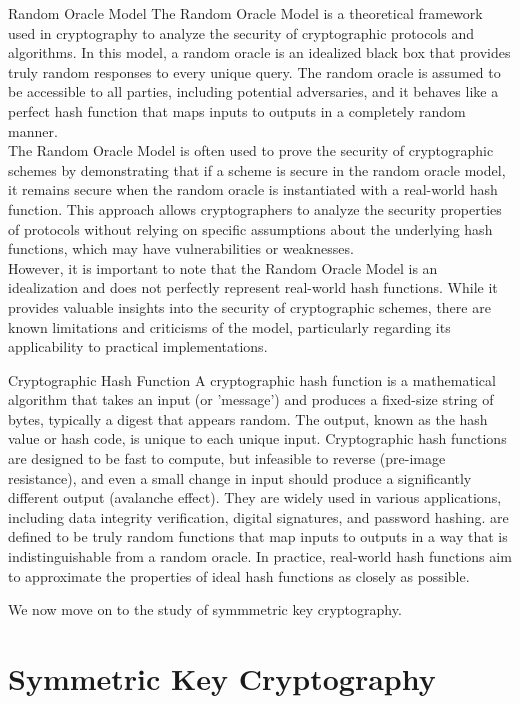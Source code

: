 \documentclass[openany]{book}
\begin{document}
\begin{mydefinition}
{Random Oracle Model}
The Random Oracle Model is a theoretical framework used in cryptography to analyze the security of cryptographic protocols and algorithms. In this model, a random oracle is an idealized black box that provides truly random responses to every unique query. The random oracle is assumed to be accessible to all parties, including potential adversaries, and it behaves like a perfect hash function that maps inputs to outputs in a completely random manner. \\
The Random Oracle Model is often used to prove the security of cryptographic schemes by demonstrating that if a scheme is secure in the random oracle model, it remains secure when the random oracle is instantiated with a real-world hash function. This approach allows cryptographers to analyze the security properties of protocols without relying on specific assumptions about the underlying hash functions, which may have vulnerabilities or weaknesses. \\
However, it is important to note that the Random Oracle Model is an idealization and does not perfectly represent real-world hash functions. While it provides valuable insights into the security of cryptographic schemes, there are known limitations and criticisms of the model, particularly regarding its applicability to practical implementations.
\end{mydefinition}
\begin{mydefinition}{Cryptographic Hash Function}
A cryptographic hash function is a mathematical algorithm that takes an input (or 'message') and produces a fixed-size string of bytes, typically a digest that appears random. The output, known as the hash value or hash code, is unique to each unique input. Cryptographic hash functions are designed to be fast to compute, but infeasible to reverse (pre-image resistance), and even a small change in input should produce a significantly different output (avalanche effect). They are widely used in various applications, including data integrity verification, digital signatures, and password hashing.
 are defined to be truly random functions that map inputs to outputs in a way that is indistinguishable from a random oracle. In practice, real-world hash functions aim to approximate the properties of ideal hash functions as closely as possible.
\end{mydefinition}
We now move on to the study of symmmetric key cryptography.
\chapter{Symmetric Key Cryptography}
\end{document}
